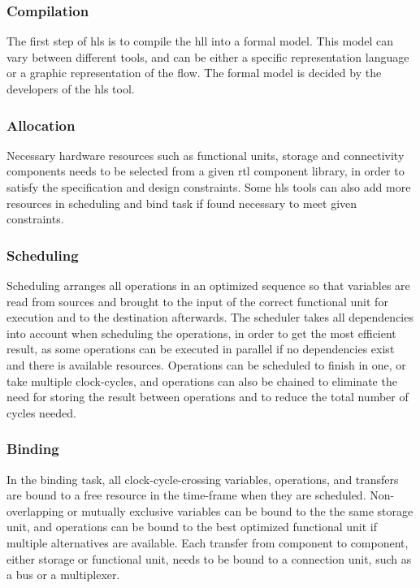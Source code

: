 \subsubsection{Compilation}

The first step of \gls{hls} is to compile the \gls{hll} into a formal model. This model can vary between different tools, and can be either a specific representation language or a graphic representation of the flow. The formal model is decided by the developers of the \gls{hls} tool. 

\subsubsection{Allocation}

Necessary hardware resources such as functional units, storage and connectivity components needs to be selected from a given \gls{rtl} component library, in order to satisfy the specification and design constraints. Some \gls{hls} tools can also add more resources in scheduling and bind task if found necessary to meet given constraints.

\subsubsection{Scheduling}
Scheduling arranges all operations in an optimized sequence so that variables are read from sources and brought to the input of the correct functional unit for execution and to the destination afterwards. The scheduler takes all dependencies into account when scheduling the operations, in order to get the most efficient result, as some operations can be executed in parallel if no dependencies exist and there is available resources. Operations can be scheduled to finish in one, or take multiple clock-cycles, and operations can also be chained to eliminate the need for storing the result between operations and to reduce the total number of cycles needed. 
\subsubsection{Binding}
In the binding task, all clock-cycle-crossing variables, operations, and transfers are bound to a free resource in the time-frame when they are scheduled. Non-overlapping or mutually exclusive variables can be bound to the the same storage unit, and operations can be bound to the best optimized functional unit if multiple alternatives are available. Each transfer from component to component, either storage or functional unit, needs to be bound to a connection unit, such as a bus or a multiplexer.
